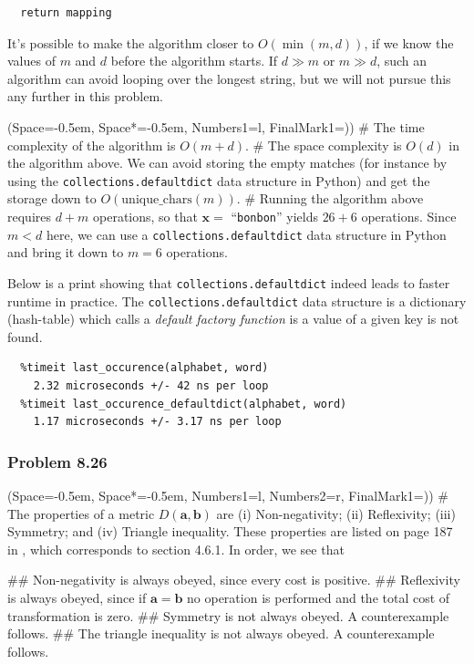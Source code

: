 \documentclass[12pt, a4paper]{article}
\newcommand{\listSpace}{-0.5em}%
\newcommand{\vect}[1]{\bm{#1}}
\begin{document}
{\begin{Verbatim}
  return mapping
\end{Verbatim}
It's possible to make the algorithm closer to $O(\min(m, d))$, if we know the values of $m$ and $d$ before the algorithm starts.
If $d\gg m$ or $m \gg d$, such an algorithm can avoid looping over the longest string, but we will not pursue this any further in this problem.
\begin{easylist}[enumerate]
	\ListProperties(Space=\listSpace, Space*=\listSpace, Numbers1=l, FinalMark1={)})
	# The time complexity of the algorithm is $O(m + d)$.
	# The space complexity is $O(d)$ in the algorithm above. We can avoid storing the empty matches (for instance by using the \texttt{collections.defaultdict} data structure in Python) and get the storage down to $O( \text{unique\_chars}(m))$.
	# Running the algorithm above requires $d + m$ operations, so that $\vect{x}=$ ``\texttt{bonbon}'' yields $26 + 6$ operations.
	Since $m < d$ here, we can use a \texttt{collections.defaultdict} data structure in Python and bring it down to $m = 6$ operations.
\end{easylist}
Below is a print showing that \texttt{collections.defaultdict} indeed leads to faster runtime in practice.
The \texttt{collections.defaultdict} data structure is a dictionary (hash-table) which calls a \emph{default factory function} is a value of a given key is not found.
\begin{Verbatim}
  %timeit last_occurence(alphabet, word)
    2.32 microseconds +/- 42 ns per loop
  %timeit last_occurence_defaultdict(alphabet, word)
    1.17 microseconds +/- 3.17 ns per loop
\end{Verbatim}


\subsubsection*{Problem 8.26}
\begin{easylist}[enumerate]
\ListProperties(Space=\listSpace, Space*=\listSpace, Numbers1=l, Numbers2=r, FinalMark1={)})
# The properties of a metric $D(\vect{a}, \vect{b})$ are
(i) Non-negativity; 
(ii) Reflexivity; 
(iii) Symmetry; and 
(iv) Triangle inequality. These properties are listed on page 187 in \cite{duda_pattern_2000}, which corresponds to section 4.6.1.
In order, we see that
\begin{easylist}
	## Non-negativity is always obeyed, since every cost is positive.
	## Reflexivity is always obeyed, since if $\vect{a} = \vect{b}$ no operation is performed and the total cost of transformation is zero.
	## Symmetry is not always obeyed. A counterexample follows.
	## The triangle inequality is not always obeyed. A counterexample follows.
\end{easylist}


\end{easylist}}
\end{document}

